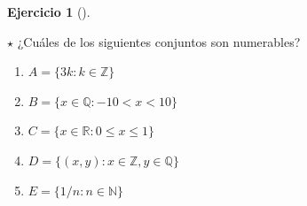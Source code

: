 \documentclass[
  a4paper,
]{scrreport}
\providecommand{\tightlist}{%
  \setlength{\itemsep}{0pt}\setlength{\parskip}{0pt}}\usepackage{longtable,booktabs,array}
\theoremstyle{definition}
\newtheorem{exercise}{Ejercicio}[chapter]
\theoremstyle{remark}
\begin{document}
\begin{tcolorbox}
\begin{tcolorbox}
\begin{tcolorbox}
\begin{tcolorbox}
\begin{tcolorbox}
\begin{tcolorbox}
\begin{tcolorbox}
\begin{tcolorbox}
\begin{tcolorbox}
\begin{tcolorbox}
\begin{tcolorbox}
\begin{tcolorbox}
\begin{tcolorbox}
\begin{tcolorbox}
\begin{tcolorbox}
\begin{tcolorbox}
\begin{tcolorbox}
\begin{tcolorbox}
\begin{tcolorbox}
\begin{tcolorbox}
\begin{tcolorbox}
\begin{tcolorbox}
\begin{tcolorbox}
\begin{tcolorbox}
\begin{tcolorbox}
\begin{tcolorbox}
\begin{tcolorbox}
\begin{tcolorbox}
\begin{tcolorbox}
\begin{tcolorbox}
\begin{tcolorbox}
\begin{tcolorbox}
\begin{tcolorbox}
\begin{tcolorbox}
\begin{tcolorbox}
\begin{tcolorbox}
\begin{tcolorbox}
\begin{tcolorbox}
\begin{tcolorbox}
\begin{tcolorbox}
\begin{tcolorbox}
\begin{tcolorbox}
\begin{tcolorbox}
\begin{tcolorbox}
\begin{exercise}[]\protect\hypertarget{exr-conjuntos-numerables}{}\label{exr-conjuntos-numerables}

\(\star\) ¿Cuáles de los siguientes conjuntos son numerables?

\begin{enumerate}
\def\labelenumi{\alph{enumi}.}
\tightlist
\item
  \(A = \{3k: k\in \mathbb{Z}\}\)
\item
  \(B = \{x\in \mathbb{Q}: -10 < x < 10\}\)
\item
  \(C = \{x\in \mathbb{R}: 0\leq x\leq 1\}\)
\item
  \(D = \{(x,y): x\in \mathbb{Z}, y\in \mathbb{Q}\}\)
\item
  \(E = \{1/n : n\in \mathbb{N}\}\)
\end{enumerate}

\end{exercise}


\end{tcolorbox}
\end{tcolorbox}
\end{tcolorbox}
\end{tcolorbox}
\end{tcolorbox}
\end{tcolorbox}
\end{tcolorbox}
\end{tcolorbox}
\end{tcolorbox}
\end{tcolorbox}
\end{tcolorbox}
\end{tcolorbox}
\end{tcolorbox}
\end{tcolorbox}
\end{tcolorbox}
\end{tcolorbox}
\end{tcolorbox}
\end{tcolorbox}
\end{tcolorbox}
\end{tcolorbox}
\end{tcolorbox}
\end{tcolorbox}
\end{tcolorbox}
\end{tcolorbox}
\end{tcolorbox}
\end{tcolorbox}
\end{tcolorbox}
\end{tcolorbox}
\end{tcolorbox}
\end{tcolorbox}
\end{tcolorbox}
\end{tcolorbox}
\end{tcolorbox}
\end{tcolorbox}
\end{tcolorbox}
\end{tcolorbox}
\end{tcolorbox}
\end{tcolorbox}
\end{tcolorbox}
\end{tcolorbox}
\end{tcolorbox}
\end{tcolorbox}
\end{tcolorbox}
\end{tcolorbox}
\end{document}
